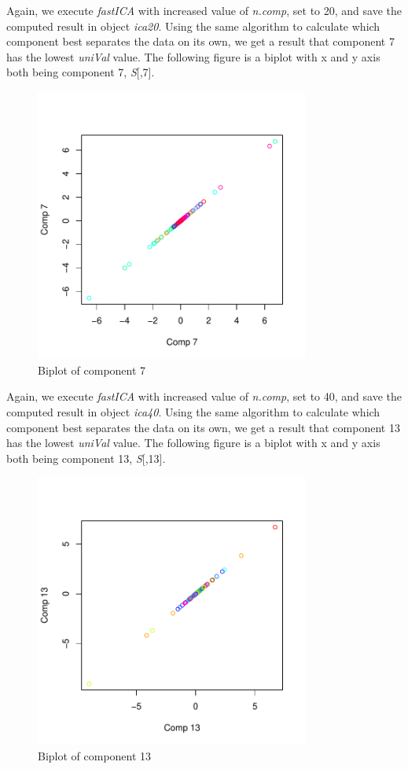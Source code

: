 Again, we execute \emph{fastICA} with increased value of \emph{n.comp}, set to 20, and save the computed result in object \emph{ica20}. Using the same algorithm to calculate which component best separates the data on its own, we get a result that component 7 has the lowest \emph{uniVal} value. The following figure is a biplot with x and y axis both being component 7, \emph{S}[,7].
\begin{figure}[H]
    \centering
    \includegraphics[width=9cm]{images/ICA/[20]/comp 7.pdf}  
    \caption{Biplot of component 7}
    \label{fig:[20]comp7} 
\end{figure}

Again, we execute \emph{fastICA} with increased value of \emph{n.comp}, set to 40, and save the computed result in object \emph{ica40}. Using the same algorithm to calculate which component best separates the data on its own, we get a result that component 13 has the lowest \emph{uniVal} value. The following figure is a biplot with x and y axis both being component 13, \emph{S}[,13].
\begin{figure}[H]
    \centering
    \includegraphics[width=9cm]{images/ICA/[40]/comp 13.pdf}  
    \caption{Biplot of component 13}
    \label{fig:[40]comp13} 
\end{figure}

